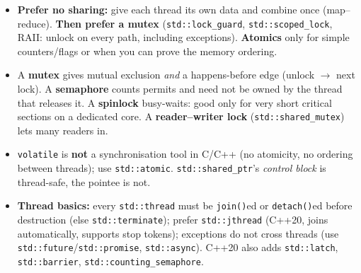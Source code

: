 \documentclass[10pt,a4paper,openany,oneside]{report}
\begin{document}
\begin{mustbox}
\begin{itemize}[nosep]
\item \textbf{Prefer no sharing:} give each thread its own data and combine once (map--reduce). \textbf{Then prefer a mutex} (\texttt{std::lock\_guard}, \texttt{std::scoped\_lock}, RAII: unlock on every path, including exceptions). \textbf{Atomics} only for simple counters/flags or when you can prove the memory ordering.
\item A \textbf{mutex} gives mutual exclusion \emph{and} a happens-before edge (unlock $\to$ next lock). A \textbf{semaphore} counts permits and need not be owned by the thread that releases it. A \textbf{spinlock} busy-waits: good only for very short critical sections on a dedicated core. A \textbf{reader--writer lock} (\texttt{std::shared\_mutex}) lets many readers in.
\item \texttt{volatile} is \textbf{not} a synchronisation tool in C/C++ (no atomicity, no ordering between threads); use \texttt{std::atomic}. \texttt{std::shared\_ptr}'s \emph{control block} is thread-safe, the pointee is not.
\item \textbf{Thread basics:} every \texttt{std::thread} must be \texttt{join()}ed or \texttt{detach()}ed before destruction (else \texttt{std::terminate}); prefer \texttt{std::jthread} (C++20, joins automatically, supports stop tokens); exceptions do not cross threads (use \texttt{std::future}/\texttt{std::promise}, \texttt{std::async}). C++20 also adds \texttt{std::latch}, \texttt{std::barrier}, \texttt{std::counting\_semaphore}.
\end{itemize}
\end{mustbox}
\end{document}
